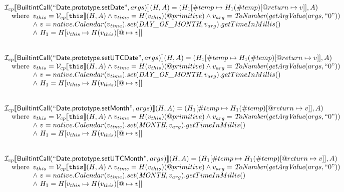 \[
\begin{array}{l}


\mathcal{I} _{cp}\llbracket \mbox{\textsf{BuiltintCall}}(``\mbox{\textsf{Date.prototype.setDate}}",args)\rrbracket(H,A)
  = (H_1[\#temp \mapsto H_1(\#temp)[@return \mapsto v]], A)\\
\quad{\rm where}\begin{array}[t]{l}
  v_{this} = \mathcal{V} _{cp}\llbracket \mbox{\texttt{this}}\rrbracket (H,A) \land v_{time} = H(v_{this})(@primitive)
  \land v_{arg} = \emph{ToNumber}(\emph{getArgValue}(args, ``0"))\\
  \land\ v = native.Calendar(v_{time}).set(\emph{DAY\_OF\_MONTH}, v_{arg}).getTimeInMillis()\\
  \land\ H_1 = H[v_{this} \mapsto H(v_{this})[@\mapsto v]]
  \end{array}\\
\\\\


\mathcal{I} _{cp}\llbracket \mbox{\textsf{BuiltintCall}}(``\mbox{\textsf{Date.prototype.setUTCDate}}",args)\rrbracket(H,A)
  = (H_1[\#temp \mapsto H_1(\#temp)[@return \mapsto v]], A)\\
\quad{\rm where}\begin{array}[t]{l}
  v_{this} = \mathcal{V} _{cp}\llbracket \mbox{\texttt{this}}\rrbracket (H,A) \land v_{time} = H(v_{this})(@primitive)
  \land v_{arg} = \emph{ToNumber}(\emph{getArgValue}(args, ``0"))\\
  \land\ v = native.Calendar(v_{time}).set(\emph{DAY\_OF\_MONTH}, v_{arg}).getTimeInMillis()\\
  \land\ H_1 = H[v_{this} \mapsto H(v_{this})[@\mapsto v]]
  \end{array}\\
\\\\


\mathcal{I} _{cp}\llbracket \mbox{\textsf{BuiltintCall}}(``\mbox{\textsf{Date.prototype.setMonth}}",args)\rrbracket(H,A)
  = (H_1[\#temp \mapsto H_1(\#temp)[@return \mapsto v]], A)\\
\quad{\rm where}\begin{array}[t]{l}
  v_{this} = \mathcal{V} _{cp}\llbracket \mbox{\texttt{this}}\rrbracket (H,A) \land v_{time} = H(v_{this})(@primitive)
  \land v_{arg} = \emph{ToNumber}(\emph{getArgValue}(args, ``0"))\\
  \land\ v = native.Calendar(v_{time}).set(\emph{MONTH}, v_{arg}).getTimeInMillis()\\
  \land\ H_1 = H[v_{this} \mapsto H(v_{this})[@\mapsto v]]
  \end{array}\\
\\\\


\mathcal{I} _{cp}\llbracket \mbox{\textsf{BuiltintCall}}(``\mbox{\textsf{Date.prototype.setUTCMonth}}",args)\rrbracket(H,A)
  = (H_1[\#temp \mapsto H_1(\#temp)[@return \mapsto v]], A)\\
\quad{\rm where}\begin{array}[t]{l}
  v_{this} = \mathcal{V} _{cp}\llbracket \mbox{\texttt{this}}\rrbracket (H,A) \land v_{time} = H(v_{this})(@primitive)
  \land v_{arg} = \emph{ToNumber}(\emph{getArgValue}(args, ``0"))\\
  \land\ v = native.Calendar(v_{time}).set(\emph{MONTH}, v_{arg}).getTimeInMillis()\\
  \land\ H_1 = H[v_{this} \mapsto H(v_{this})[@\mapsto v]]
  \end{array}\\
\\\\



\end{array}\]

